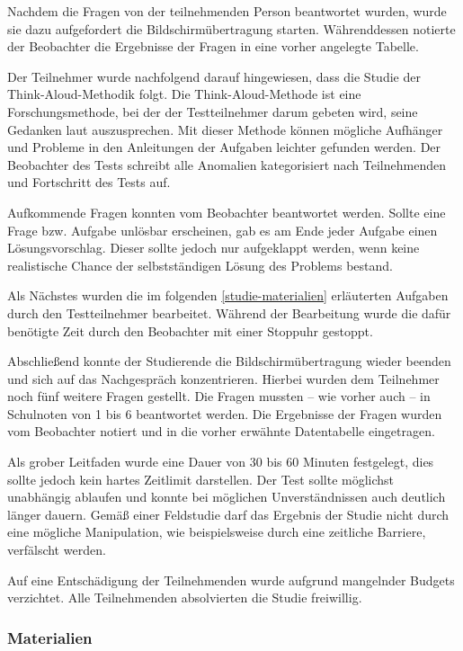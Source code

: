 Nachdem die Fragen von der teilnehmenden Person beantwortet wurden, wurde sie
dazu aufgefordert die Bildschirmübertragung starten. Währenddessen notierte der
Beobachter die Ergebnisse der Fragen in eine vorher angelegte Tabelle.

Der Teilnehmer wurde nachfolgend darauf hingewiesen, dass die Studie der
Think-Aloud-Methodik folgt. Die Think-Aloud-Methode ist eine Forschungsmethode,
bei der der Testteilnehmer darum gebeten wird, seine Gedanken laut
auszusprechen. Mit dieser Methode können mögliche Aufhänger und Probleme in den
Anleitungen der Aufgaben leichter gefunden werden. Der Beobachter des Tests
schreibt alle Anomalien kategorisiert nach Teilnehmenden und Fortschritt des
Tests auf. \parencite{think-aloud}

Aufkommende Fragen konnten vom Beobachter beantwortet werden. Sollte eine Frage
bzw. Aufgabe unlösbar erscheinen, gab es am Ende jeder Aufgabe einen
Lösungsvorschlag. Dieser sollte jedoch nur aufgeklappt werden, wenn keine
realistische Chance der selbstständigen Lösung des Problems bestand.

Als Nächstes wurden die im folgenden \autoref{studie-materialien} erläuterten
Aufgaben durch den Testteilnehmer bearbeitet. Während der Bearbeitung wurde die
dafür benötigte Zeit durch den Beobachter mit einer Stoppuhr gestoppt.

Abschließend konnte der Studierende die Bildschirmübertragung wieder beenden und
sich auf das Nachgespräch konzentrieren. Hierbei wurden dem Teilnehmer noch
fünf weitere Fragen gestellt. Die Fragen mussten -- wie vorher auch -- in
Schulnoten von 1 bis 6 beantwortet werden. Die Ergebnisse der Fragen wurden vom
Beobachter notiert und in die vorher erwähnte Datentabelle eingetragen.

Als grober Leitfaden wurde eine Dauer von 30 bis 60 Minuten festgelegt, dies
sollte jedoch kein hartes Zeitlimit darstellen. Der Test sollte möglichst
unabhängig ablaufen und konnte bei möglichen Unverständnissen auch deutlich
länger dauern. Gemäß einer Feldstudie darf das Ergebnis der Studie nicht durch
eine mögliche  Manipulation, wie beispielsweise durch eine zeitliche Barriere,
verfälscht werden.

Auf eine Entschädigung der Teilnehmenden wurde aufgrund mangelnder Budgets
verzichtet. Alle Teilnehmenden absolvierten die Studie freiwillig.

\subsubsection{Materialien}\label{studie-materialien}
